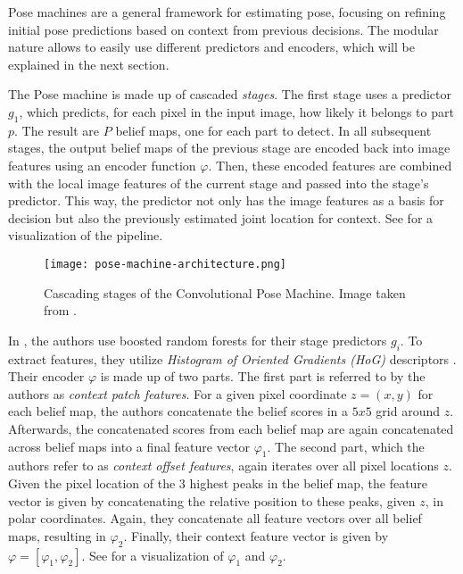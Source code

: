 Pose machines are a general framework for estimating pose, focusing on refining initial pose predictions based on context from previous decisions.
The modular nature allows to easily use different predictors and encoders, which will be explained in the next section.

The Pose machine is made up of cascaded \textit{stages}.
The first stage uses a predictor $g_1$, which predicts, for each pixel in the input image, how likely it belongs to part $p$.
The result are $P$ belief maps, one for each part to detect.
In all subsequent stages, the output belief maps of the previous stage are encoded back into image features using an encoder function $\varphi$.
Then, these encoded features are combined with the local image features of the current stage and passed into the stage's predictor.
This way, the predictor not only has the image features as a basis for decision but also the previously estimated joint location for context.
See  for a visualization of the pipeline.

\begin{figure}[htb!]
    \centering
    \texttt{[image: pose-machine-architecture.png]}
    \caption{Cascading stages of the Convolutional Pose Machine. Image taken from \cite{wei_convolutional_2016}.}
    \label{fig:pose-machines-architecture}
\end{figure}

In \cite{ramakrishna_pose_2014}, the authors use boosted random forests for their stage predictors $g_i$.
To extract features, they utilize \textit{Histogram of Oriented Gradients (HoG)} descriptors \cite{dalal_histograms_2005}.
Their encoder $\varphi$ is made up of two parts.
The first part is referred to by the authors as \textit{context patch features}.
For a given pixel coordinate $z = (x, y)$ for each belief map, the authors concatenate the belief scores in a $5 x 5$ grid around $z$.
Afterwards, the concatenated scores from each belief map are again concatenated across belief maps into a final feature vector $\varphi_1$.
The second part, which the authors refer to as \textit{context offset features}, again iterates over all pixel locations $z$.
Given the pixel location of the $3$ highest peaks in the belief map, the feature vector is given by concatenating the relative position to these peaks, given $z$, in polar coordinates.
Again, they concatenate all feature vectors over all belief maps, resulting in $\varphi_2$.
Finally, their context feature vector is given by $\varphi = [\varphi_1, \varphi_2]$.
See  for a visualization of $\varphi_1$ and $\varphi_2$.

